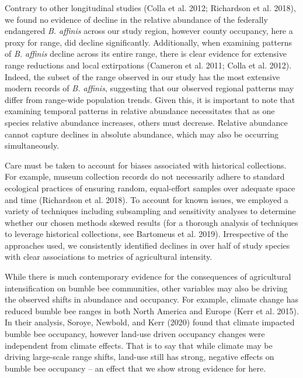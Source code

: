 \documentclass[11pt,]{article}
\begin{document}
Contrary to other longitudinal studies (Colla et al. 2012; Richardson et
al. 2018), we found no evidence of decline in the relative abundance of
the federally endangered \emph{B. affinis} across our study region,
however county occupancy, here a proxy for range, did decline
significantly. Additionally, when examining patterns of \emph{B.
affinis} decline across its entire range, there is clear evidence for
extensive range reductions and local extirpations (Cameron et al. 2011;
Colla et al. 2012). Indeed, the subset of the range observed in our
study has the most extensive modern records of \emph{B. affinis},
suggesting that our observed regional patterns may differ from
range-wide population trends. Given this, it is important to note that
examining temporal patterns in relative abundance necessitates that as
one species relative abundance increases, others must decrease. Relative
abundance cannot capture declines in absolute abundance, which may also
be occurring simultaneously.

Care must be taken to account for biases associated with historical
collections. For example, museum collection records do not necessarily
adhere to standard ecological practices of ensuring random, equal-effort
samples over adequate space and time (Richardson et al. 2018). To
account for known issues, we employed a variety of techniques including
subsampling and sensitivity analyses to determine whether our chosen
methods skewed results (for a thorough analysis of techniques to
leverage historical collections, see Bartomeus et al. 2019).
Irrespective of the approaches used, we consistently identified declines
in over half of study species with clear associations to metrics of
agricultural intensity.

While there is much contemporary evidence for the consequences of
agricultural intensification on bumble bee communities, other variables
may also be driving the observed shifts in abundance and occupancy. For
example, climate change has reduced bumble bee ranges in both North
America and Europe (Kerr et al. 2015). In their analysis, Soroye,
Newbold, and Kerr (2020) found that climate impacted bumble bee
occupancy, however land-use driven occupancy changes were independent
from climate effects. That is to say that while climate may be driving
large-scale range shifts, land-use still has strong, negative effects on
bumble bee occupancy -- an effect that we show strong evidence for here.
\end{document}
